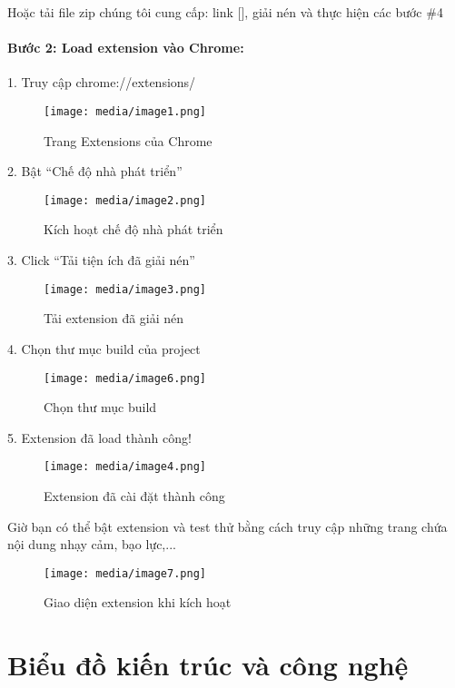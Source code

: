 \documentclass[12pt,a4paper]{article}
\begin{document}
Hoặc tải file zip chúng tôi cung cấp: link [], giải nén và thực hiện các bước \#4

\paragraph{Bước 2: Load extension vào Chrome:}\mbox{}

1. Truy cập chrome://extensions/

\begin{figure}[H]
  \centering
  \texttt{[image: media/image1.png]}
  \caption{Trang Extensions của Chrome}
\end{figure}

2. Bật ``Chế độ nhà phát triển''

\begin{figure}[H]
  \centering
  \texttt{[image: media/image2.png]}
  \caption{Kích hoạt chế độ nhà phát triển}
\end{figure}

3. Click ``Tải tiện ích đã giải nén''

\begin{figure}[H]
  \centering
  \texttt{[image: media/image3.png]}
  \caption{Tải extension đã giải nén}
\end{figure}

4. Chọn thư mục build của project

\begin{figure}[H]
  \centering
  \texttt{[image: media/image6.png]}
  \caption{Chọn thư mục build}
\end{figure}

5. Extension đã load thành công!

\begin{figure}[H]
  \centering
  \texttt{[image: media/image4.png]}
  \caption{Extension đã cài đặt thành công}
\end{figure}

Giờ bạn có thể bật extension và test thử bằng cách truy cập những trang chứa nội dung nhạy cảm, bạo lực,...

\begin{figure}[H]
  \centering
  \texttt{[image: media/image7.png]}
  \caption{Giao diện extension khi kích hoạt}
\end{figure}

\section{Biểu đồ kiến trúc và công nghệ}
\end{document}
